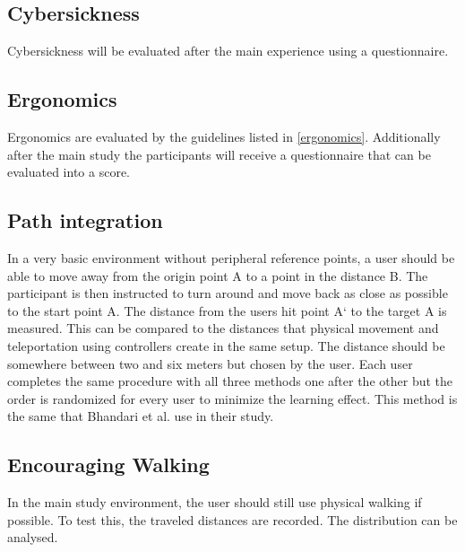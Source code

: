 \subsection{Cybersickness}
Cybersickness will be evaluated after the main experience using a questionnaire.


\subsection{Ergonomics}
Ergonomics are evaluated by the guidelines listed in \ref{ergonomics}. Additionally after the main study the participants will receive a questionnaire that can be evaluated into a score.


\subsection{Path integration}
In a very basic environment without peripheral reference points, a user should be able to move away from the origin point A to a point in the distance B. The participant is then instructed to turn around and move back as close as possible to the start point A. The distance from the users hit point A` to the target A is measured. This can be compared to the distances that physical movement and teleportation using controllers create in the same setup. The distance should be somewhere between two and six meters but chosen by the user. Each user completes the same procedure with all three methods one after the other but the order is randomized for every user to minimize the learning effect. This method is the same that Bhandari et al. \cite{Bhandari} use in their study.


\subsection{Encouraging Walking}
In the main study environment, the user should still use physical walking if possible. To test this, the traveled distances are recorded. The distribution can be analysed.
